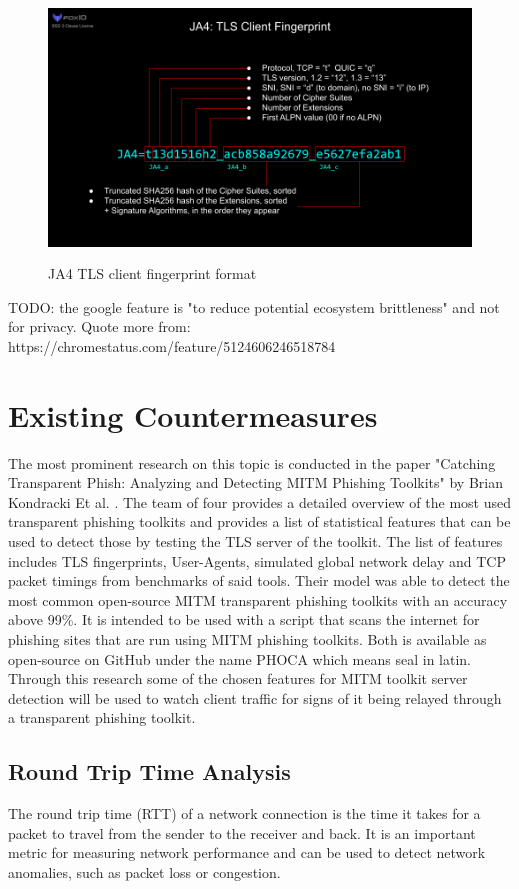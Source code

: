 \documentclass[12pt]{scrbook}
\begin{document}
\begin{figure}[!htb] \centering
  \includegraphics[height=7cm]{./images/JA4.png} \caption{JA4 TLS client
fingerprint format} \end{figure}

TODO: the google feature is "to reduce potential ecosystem brittleness" and
not for privacy. Quote more from:
https://chromestatus.com/feature/5124606246518784

\section{Existing Countermeasures}
The most prominent research on this topic is conducted in the paper "Catching Transparent Phish:
Analyzing and Detecting MITM Phishing Toolkits" by Brian Kondracki Et al. \cite{kondracki2021catching}.
The team of four provides a detailed overview of the most used transparent phishing toolkits and provides
a list of statistical features that can be used to detect those by testing the TLS server of the toolkit.
The list of features includes TLS fingerprints, User-Agents, simulated global network delay and TCP packet timings from benchmarks of said tools.
Their model was able to detect the most common open-source MITM transparent phishing toolkits with an accuracy above 99\%.
It is intended to be used with a script that scans the internet for phishing sites that are run using MITM phishing toolkits.
Both is available as open-source on GitHub under the name PHOCA which means seal in latin.\cite{kondracki2021catchingGit}
Through this research some of the chosen features for MITM toolkit server detection will be used to watch client traffic for signs of it being relayed through a transparent phishing toolkit.

\newpage \subsection{Round Trip Time Analysis}
The round trip time (RTT) of a network connection is the time it takes for a
packet to travel from the sender to the receiver and back. It is an important
metric for measuring network performance and can be used to detect network
anomalies, such as packet loss or congestion.
\end{document}
